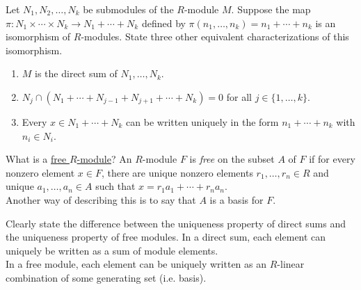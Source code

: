 \documentclass[avery5371,grid]{flashcards}
\begin{document}
\begin{flashcard}[Modules]{Let $N_1, N_2, \ldots, N_k$ be submodules of the $R$-module $M$. Suppose the map $\pi: N_1 \times \cdots \times N_k \to N_1 + \cdots + N_k$ defined by $\pi(n_1, \ldots, n_k) = n_1 + \cdots + n_k$ is an isomorphism of $R$-modules. State three other equivalent characterizations of this isomorphism.}
 \begin{enumerate}
      \item $M$ is the direct sum of $N_1, \ldots, N_k$.
      \item $N_j \cap (N_1 + \cdots + N_{j-1} + N_{j+1} + \cdots + N_k) = 0$ for all $j \in \{1, \ldots, k\}$.
      \item Every $x \in N_1 + \cdots + N_k$ can be written uniquely in the form $n_1 + \cdots + n_k$ with $n_i \in N_i$.
 \end{enumerate}

\end{flashcard}

\begin{flashcard}[Modules]{What is a \underline{free $R$-module}?}
 An $R$-module $F$ is \emph{free} on the subset $A$ of $F$ if for every nonzero element $x \in F$, there are unique nonzero elements $r_1, \ldots, r_n \in R$ and unique $a_1, \ldots, a_n \in A$ such that $x = r_1a_1 + \cdots + r_na_n.$\\
 
 Another way of describing this is to say that $A$ is a basis for $F$.
\end{flashcard}

\begin{flashcard}[Modules]{Clearly state the difference between the uniqueness property of direct sums and the uniqueness property of free modules.}
 In a direct sum, each element can uniquely be written as a sum of module elements.\\
 
 In a free module, each element can be uniquely written as an $R$-linear combination of some generating set (i.e. basis).
\end{flashcard}
\end{document}
